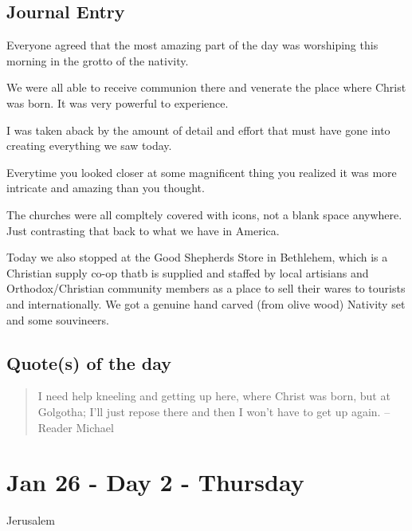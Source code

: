 \documentclass[letterpaper]{report}
\begin{document}
\clearpage
\begin{multicols}{2}
\section{Journal Entry}
Everyone agreed that the most amazing part of the day was worshiping this morning in
the grotto of the nativity.

We were all able to receive communion there and venerate the place where Christ was born.
It was very powerful to experience.

I was taken aback by the amount of detail and effort that must have gone into creating everything we saw today.

Everytime you looked closer at some magnificent thing you realized it was more intricate and amazing than you thought.

The churches were all compltely covered with icons, not a blank space anywhere.  Just contrasting that back to what we have in America.

Today we also stopped at the Good Shepherds Store in Bethlehem,
which is a Christian supply co-op thatb is supplied and staffed by local artisians and Orthodox/Christian community members as a place to sell their wares to tourists and internationally. 
We got a genuine hand carved (from olive wood) Nativity set and some souvineers.

\section{Quote(s) of the day}
\begin{quote}
 I need help kneeling and getting up here, where Christ was born, but at Golgotha;
I'll just repose there and then I won't have to get up again.
-- Reader Michael
\end{quote}
\end{multicols}

\clearpage
\chapter{Jan 26 - Day 2 - Thursday}
Jerusalem
\end{document}
